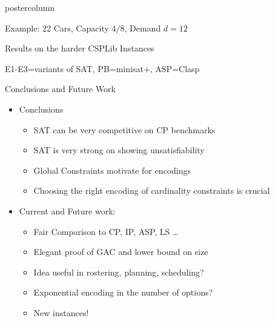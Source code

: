 \documentclass[final]{beamer}
\begin{document}
\begin{frame}
\begin{columns}
\begin{column}{.49\textwidth}
\begin{beamercolorbox}[center,wd=\textwidth]{postercolumn}
\begin{minipage}[T]{.95\textwidth}
{\begin{block}{Example: 22 Cars, Capacity $4/8$, Demand $d=12$}
                
            \end{block}
            \vfill
            \begin{block}{Results on the harder CSPLib Instances}
                \begin{center}
                
                \end{center}
                    E1-E3=variants of SAT, PB=minisat+, ASP=Clasp
            \end{block}
            \vfill
            \begin{block}{Conclusions and Future Work}
                \begin{itemize}
                \item Conclusions
                    \begin{itemize}
                    \itemsep1pt\parskip0pt
                    \item
                      SAT can be very competitive on CP benchmarks
                    \item
                      SAT is very strong on showing unsatisfiability
                    \item
                      Global Constraints motivate for encodings
                    \item
                      Choosing the right encoding of cardinality constraints is crucial
                    \end{itemize}
                \item Current and Future work:
                    \begin{itemize}
                    \itemsep1pt\parskip0pt
                    \item
                      Fair Comparison to CP, IP, ASP, LS \ldots
                    \item
                      Elegant proof of GAC and lower bound on size
                    \item
                      Idea useful in rostering, planning, scheduling?
                    \item
                      Exponential encoding in the number of options?
                    \item
                      New instances!
                    \end{itemize}
                \end{itemize}
            \end{block}
}
\end{minipage}
\end{beamercolorbox}
\end{column}
\end{columns}
\end{frame}
\end{document}
